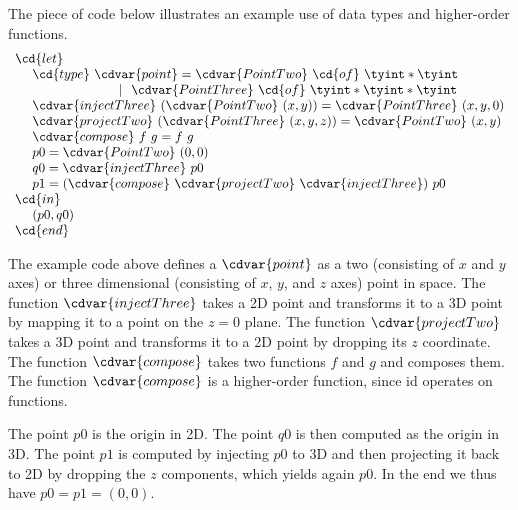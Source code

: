 \begin{cluster}
\label{grp:xmpl:sparc::piece}

\begin{example}
\label{xmpl:sparc::piece}
The piece of code below illustrates an example use of data types and
higher-order functions.
\[
\begin{array}{l}
\cd{let}
\\ 
~~~~\cd{type}~\cdvar{point} = \cdvar{PointTwo}~\cd{of}~\tyint * \tyint
\\ 
~~~~~~~~~~~~~~~~~~~~~~~~|~~\cdvar{PointThree}~\cd{of}~ \tyint * \tyint * \tyint
\\
~~~~\cdvar{injectThree}~(\cdvar{PointTwo}~(x, y)) = \cdvar{PointThree}~(x, y, 0)
\\  
~~~~\cdvar{projectTwo}~(\cdvar{PointThree}~(x, y, z)) = \cdvar{PointTwo}~(x, y)
\\ 
~~~~\cdvar{compose}~f~g = f~g  
\\
~~~~p0 = \cdvar{PointTwo}~(0,0)
\\
~~~~q0 = \cdvar{injectThree}~p0
\\
~~~~p1 = (\cdvar{compose}~\cdvar{projectTwo}~\cdvar{injectThree})~p0
\\
\cd{in} 
\\
~~~~(p0, q0)
\\
\cd{end}
\end{array}
\]

The example code above defines a $\cdvar{point}$ as a two (consisting of
$x$ and $y$ axes) or three dimensional (consisting of $x$, $y$, and
$z$ axes) point in space.
The function $\cdvar{injectThree}$ takes a 2D point and transforms it to a 3D
point by mapping it to a point on the $z=0$ plane. 
The function $\cdvar{projectTwo}$ takes a 3D point and transforms it to a 2D
point by dropping its $z$ coordinate.
The function $\cdvar{compose}$ takes two functions $f$ and $g$ and composes
them.
The function $\cdvar{compose}$ is a higher-order function, since id operates
on functions.

The point $p0$ is the origin in 2D.  The point $q0$ is then computed
as the origin in 3D.  The point $p1$ is computed by injecting $p0$ to
3D and then projecting it back to 2D by dropping the $z$ components,
which yields again $p0$.  
In the end we thus have $p0 = p1 = (0,0)$. 

\end{example}
\end{cluster}

